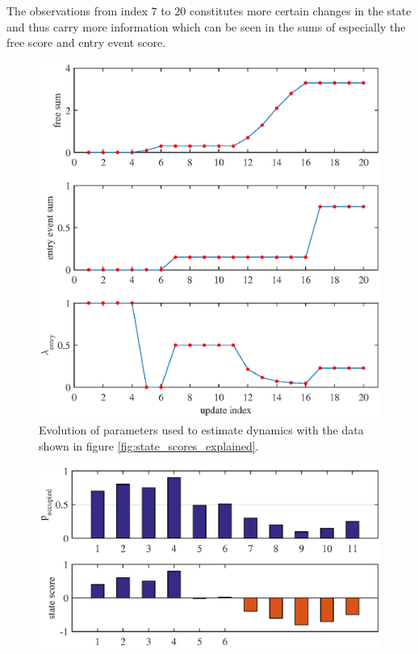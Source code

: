 The observations from index $7$ to $20$ constitutes more certain changes in the state and thus carry more information which can be seen in the sums of especially the free score and entry event score. 

\begin{figure}[htbp]
    \centering
    \includegraphics[scale=1]{chapters/mapping_of_dynamic_areas/figures/pmac_entry_explained}
    \caption{Evolution of parameters used to estimate dynamics with the data shown in figure \ref{fig:state_scores_explained}.}
    \label{fig:pmac_entry_explained}
\end{figure}


\begin{figure}[htbp]
\centering
\includegraphics[scale=1]{chapters/mapping_of_dynamic_areas/figures/pmac_noise_problem_case}
\caption{}
\label{fig:pmac_noise_problem_case}
\end{figure}

